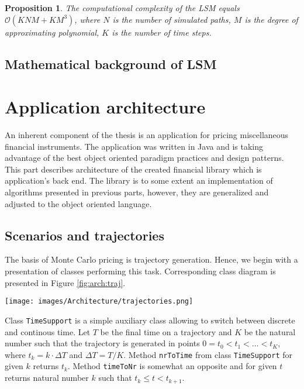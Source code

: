 \documentclass[a4paper,12pt, oneside]{book}
\newtheorem{prop}[thm]{Proposition}
\theoremstyle{definition}
\theoremstyle{remark}
\begin{document}
\begin{prop}
 The computational complexity of the LSM equals $\mathcal{O}(KNM + KM^3)$, where $N$ is the number of simulated paths, $M$ is the degree of approximating polynomial, $K$ is the number of time steps.
\end{prop}

\section{Mathematical background of LSM}

\chapter{Application architecture}
An inherent component of the thesis is an application for pricing miscellaneous financial instruments. The application was written in Java and is taking advantage of the best object oriented paradigm practices and design patterns. This part describes architecture of the created financial library which is application's back end. The library is to some extent an implementation of algorithms presented in previous parts, however, they are generalized and adjusted to the object oriented language.

\section{Scenarios and trajectories}
The basis of Monte Carlo pricing is trajectory generation. Hence, we begin with a presentation of classes performing this task. Corresponding class diagram is presented in Figure \ref{fig:arch:traj}.

\begin{sidewaysfigure}
\centering
 \texttt{[image: images/Architecture/trajectories.png]}
\caption{Diagram presenting classes designated for scenario generation.}
\label{fig:arch:traj}
\end{sidewaysfigure}

Class \texttt{TimeSupport} is a simple auxiliary class allowing to switch between discrete and continous time. Let $T$ be the final time on a trajectory and $K$ be the natural number such that the trajectory is generated in points $0 = t_0 < t_1 < \ldots < t_K$, where $t_k = k \cdot \Delta T$ and $\Delta T = T / K$. Method \texttt{nrToTime} from class \texttt{TimeSupport} for given $k$ returns $t_k$. Method \texttt{timeToNr} is somewhat an opposite and for given $t$ returns natural number $k$ such that $t_k \leq t < t_{k+1}$. 
\end{document}
